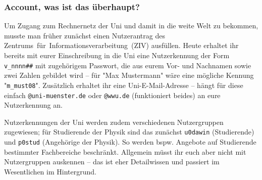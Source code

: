 \begin{multicols}{2}
\subsubsection*{Account, was ist das überhaupt?}
Um Zugang zum Rechnernetz der Uni und damit in die weite Welt zu bekommen, musste man früher zunächst einen Nutzerantrag des Zentrums~für~Informationsverarbeitung~(ZIV) ausfüllen.
%
Heute erhaltet ihr bereits mit eurer Einschreibung in die Uni eine Nutzerkennung der Form \texttt{v\_nnnn\#\#} mit zugehörigem Passwort, die aus eurem Vor- und Nachnamen sowie zwei Zahlen gebildet wird -- für "Max Mustermann" wäre eine mögliche Kennung "\texttt{m\_must08}". Zusätzlich erhaltet ihr eine Uni-E-Mail-Adresse -- hängt für diese einfach \texttt{@uni-muenster.de} oder \texttt{@wwu.de} (funktioniert beides) an eure Nutzerkennung an.

Nutzerkennungen der Uni werden zudem verschiedenen Nutzergruppen zugewiesen; für Studierende der Physik sind das zunächst \texttt{u0dawin} (Studierende) und \texttt{p0stud} (Angehörige der Physik). So werden bspw. Angebote auf Studierende bestimmter Fachbereiche beschränkt. Allgemein müsst ihr euch aber nicht mit Nutzergruppen auskennen -- das ist eher Detailwissen und passiert im Wesentlichen im Hintergrund.


\end{multicols}
